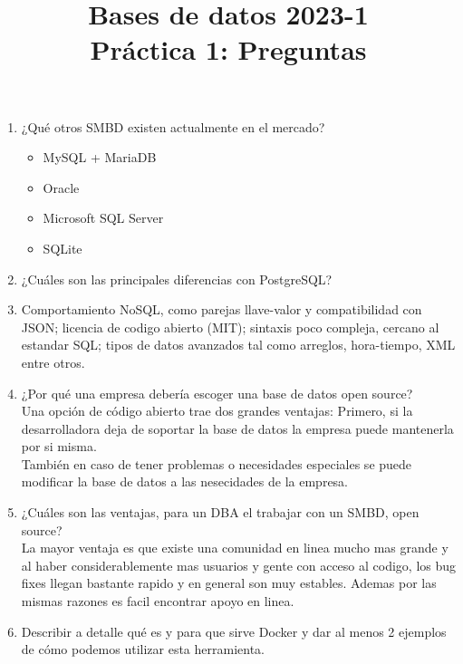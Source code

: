 \documentclass[12pt,a4paper]{article}
\title{Bases de datos 2023-1\\
Práctica 1: Preguntas}
\begin{document}
\maketitle

\begin{enumerate}
	\item ¿Qué otros SMBD existen actualmente en el mercado?\\
		\begin{itemize}
			\item MySQL + MariaDB
			\item Oracle
			\item Microsoft SQL Server
			\item SQLite
		\end{itemize}

	\item ¿Cuáles son las principales diferencias con PostgreSQL?\\
		\item Comportamiento NoSQL, como parejas llave-valor y compatibilidad con
		JSON; licencia de codigo abierto (MIT); sintaxis poco compleja, cercano al
		estandar SQL; tipos de datos avanzados tal como arreglos, hora-tiempo, XML
		entre otros.

	\item ¿Por qué una empresa debería escoger una base de datos open source?\\
		Una opción de código abierto trae dos grandes ventajas:
		Primero, si la desarrolladora deja de soportar la base de datos la empresa
		puede mantenerla por si misma.\\
		También en caso de tener problemas o necesidades especiales se puede
		modificar la base de datos a las nesecidades de la empresa.\\

	\item ¿Cuáles son las ventajas, para un DBA el trabajar con un SMBD, open source?\\

		La mayor ventaja es que existe una comunidad en linea mucho mas grande y al haber
		considerablemente mas usuarios y gente con acceso al codigo, los bug fixes llegan bastante rapido
		y en general son muy estables. Ademas por las mismas razones es facil encontrar apoyo en linea.

	\item Describir a detalle qué es y para que sirve Docker y dar al menos 2 ejemplos\\
		de cómo podemos utilizar esta herramienta.


\end{enumerate}
\end{document}
